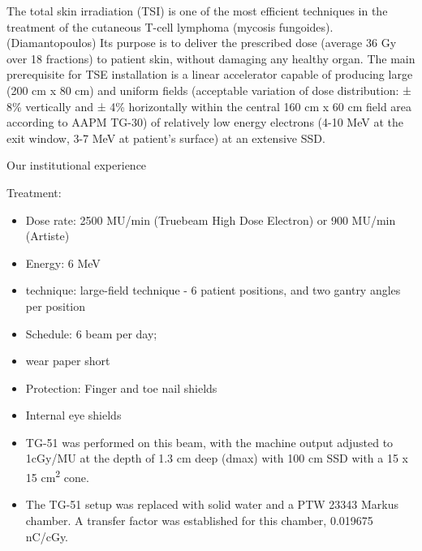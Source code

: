 \documentclass[]{book}
\theoremstyle{definition}
\theoremstyle{definition}
\theoremstyle{definition}
\theoremstyle{remark}
\begin{document}
The total skin irradiation (TSI) is one of the most efficient techniques
in the treatment of the cutaneous T-cell lymphoma (mycosis fungoides).
(Diamantopoulos) Its purpose is to deliver the prescribed dose (average
36 Gy over 18 fractions) to patient skin, without damaging any healthy
organ. The main prerequisite for TSE installation is a linear
accelerator capable of producing large (200 cm x 80 cm) and uniform
fields (acceptable variation of dose distribution: ± 8\% vertically and
± 4\% horizontally within the central 160 cm x 60 cm field area
according to AAPM TG-30) of relatively low energy electrons (4-10 MeV at
the exit window, 3-7 MeV at patient's surface) at an extensive SSD.

Our institutional experience

Treatment:

\begin{itemize}
\item
  Dose rate: 2500 MU/min (Truebeam High Dose Electron) or 900 MU/min
  (Artiste)
\item
  Energy: 6 MeV
\item
  technique: large-field technique - 6 patient positions, and two gantry
  angles per position
\item
  Schedule: 6 beam per day;
\item
  wear paper short
\item
  Protection: Finger and toe nail shields
\item
  Internal eye shields
\item
  TG-51 was performed on this beam, with the machine output adjusted to
  1cGy/MU at the depth of 1.3 cm deep (dmax) with 100 cm SSD with a 15 x
  15 cm\textsuperscript{2} cone.
\item
  The TG-51 setup was replaced with solid water and a PTW 23343 Markus
  chamber. A transfer factor was established for this chamber, 0.019675
  nC/cGy.
\end{itemize}
\end{document}
